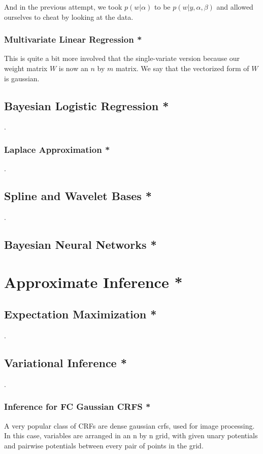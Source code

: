 \documentclass[12pt]{article}
\begin{document}

And in the previous attempt, we took $p(w|\alpha)$ to be $p(w|y, \alpha, \beta)$ and allowed ourselves to cheat by looking at the data.



\subsubsection{Multivariate Linear Regression *}

This is quite a bit more involved that the single-variate version because our weight matrix $W$ is now an $n$ by $m$ matrix. We say that the vectorized form of $W$ is gaussian.

\subsection{Bayesian Logistic Regression *}
.
\subsubsection{Laplace Approximation *}
.
\subsection{Spline and Wavelet Bases *}
.
\subsection{Bayesian Neural Networks *}

\section{Approximate Inference *}

\subsection{Expectation Maximization *}
.
\subsection{Variational Inference *}
.
\subsubsection{Inference for FC Gaussian CRFS *}

A very popular class of CRFs are dense gaussian crfs, used for image processing. In this case, variables are arranged in an n by n grid, with given unary potentials and pairwise potentials between every pair of points in the grid.
\end{document}
